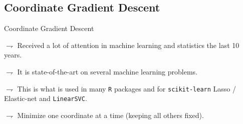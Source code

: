 \documentclass[9pt]{beamer}
\newcommand{\grad}{\nabla}
\newcommand\R{\mathds{R}}
\begin{document}
\subsection{Coordinate Gradient Descent}


\begin{frame}{Coordinate Gradient Descent}

$\rightharpoondown$ Received a lot of attention in machine learning and statistics the last 10 years.
	
$\rightharpoondown$ It is \alert{state-of-the-art on several machine learning problems}.
	
$\rightharpoondown$ This is what is used in many \texttt{R} packages and for \texttt{scikit-learn} Lasso / Elastic-net and \texttt{LinearSVC}.


\bigskip


$\rightharpoondown$ Minimize \alert{one coordinate at a time} (keeping all others fixed).
\end{frame}


%	
%
%
\end{document}
